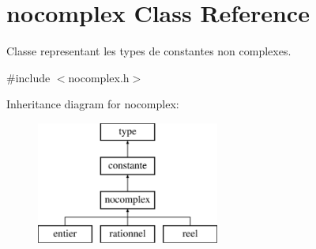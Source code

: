 \hypertarget{classnocomplex}{\section{nocomplex Class Reference}
\label{classnocomplex}
}


Classe representant les types de constantes non complexes.  




{\ttfamily \#include $<$nocomplex.\-h$>$}

Inheritance diagram for nocomplex\-:\begin{figure}[H]
\begin{center}
\leavevmode
\includegraphics[height=4.000000cm]{classnocomplex}
\end{center}
\end{figure}
